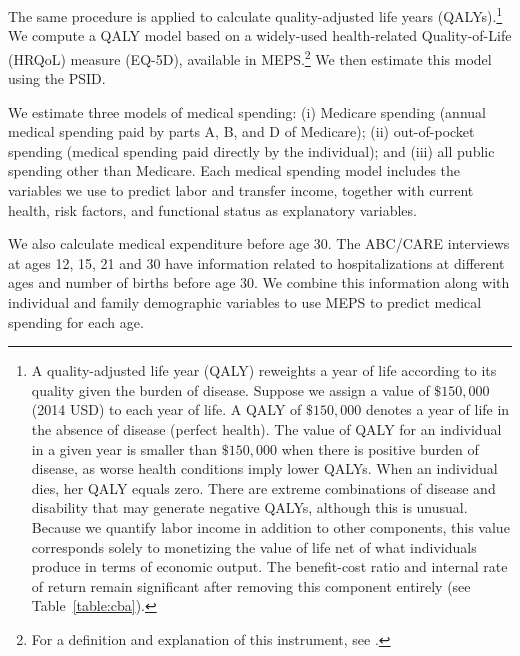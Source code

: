 The same procedure is applied to calculate quality-adjusted life years (QALYs).\footnote{A quality-adjusted life year (QALY) reweights a year of life according to its quality given the burden of disease. Suppose we assign a value of $\$150,000$ (2014 USD) to each year of life. A QALY of $\$150,000$ denotes a year of life in the absence of disease (perfect health). The value of QALY for an individual in a given year is smaller than $\$150,000$ when there is positive burden of disease, as worse health conditions imply lower QALYs. When an individual dies, her QALY equals zero. There are extreme combinations of disease and disability that may generate negative QALYs, although this is unusual. Because we quantify labor income in addition to other components, this value corresponds solely to monetizing the value of life net of what individuals produce in terms of economic output. The benefit-cost ratio and internal rate of return remain significant after removing this component entirely (see Table~\ref{table:cba}).} We compute a QALY model based on a widely-used health-related Quality-of-Life (HRQoL) measure (EQ-5D), available in MEPS.\footnote{For a definition and explanation of this instrument, see \citet{Dolan_1997_Modeling_MC,Shaw_etal_2005_EQ5D_MC}.} We then estimate this model using the PSID.

We estimate three models of medical spending: (i) Medicare spending (annual medical spending paid by parts A, B, and D of Medicare); (ii) out-of-pocket spending (medical spending paid directly by the individual); and (iii) all public spending other than Medicare. Each medical spending model includes the variables we use to predict labor and transfer income, together with current health, risk factors, and functional status as explanatory variables.

We also calculate medical expenditure before age 30. The ABC/CARE interviews at ages 12, 15, 21 and 30 have information related to hospitalizations at different ages and number of births before age 30. We combine this information along with individual and family demographic variables to use MEPS to predict medical spending for each age.

